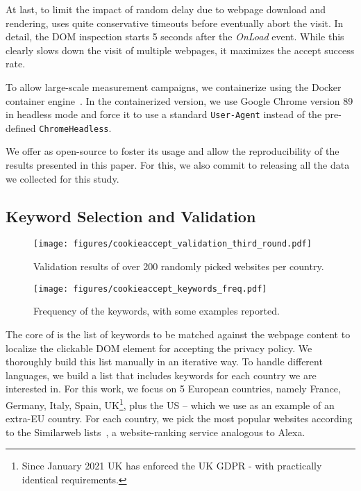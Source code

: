 At last, to limit the impact of random delay due to webpage download and rendering, \TOOL uses quite conservative timeouts before eventually abort the visit. In detail, the DOM inspection starts 5 seconds after the \emph{OnLoad} event. While this clearly slows down the visit of multiple webpages, it maximizes the accept success rate.

To allow large-scale measurement campaigns, we containerize \TOOL using the Docker container engine~\cite{docker}. In the containerized version, we use Google Chrome version 89 in headless mode and force it to use a standard \texttt{User-Agent} instead of the pre-defined \texttt{ChromeHeadless}.

We offer \TOOL as open-source to foster its usage and allow the reproducibility of the results presented in this paper. For this, we also commit to releasing all the data we collected for this study.

\subsection{Keyword Selection and Validation}

\begin{figure}[t]
    \centering
    \texttt{[image: figures/cookieaccept\_validation\_third\_round.pdf]}
    \caption{Validation results of \TOOL over 200 randomly picked websites per country.}
    \label{fig:validation}
\end{figure}

\begin{figure}[t]
    \centering
    \texttt{[image: figures/cookieaccept\_keywords\_freq.pdf]}
    \caption{Frequency of the \TOOL keywords, with some examples reported.}
    \label{fig:keywords}
\end{figure}

The core of \TOOL is the list of keywords to be matched against the webpage content to localize the clickable DOM element for accepting the privacy policy. We thoroughly build this list manually in an iterative way. To handle different languages, we build a list that includes keywords for each country we are interested in. For this work, we focus on 5 European countries, namely France, Germany, Italy, Spain, UK\footnote{Since January 2021 UK has enforced the UK GDPR - with practically identical requirements.}, plus the US -- which we use as an example of an extra-EU country. For each country, we pick the most popular websites according to the Similarweb lists~\cite{similarweb}, a website-ranking service analogous to Alexa.

